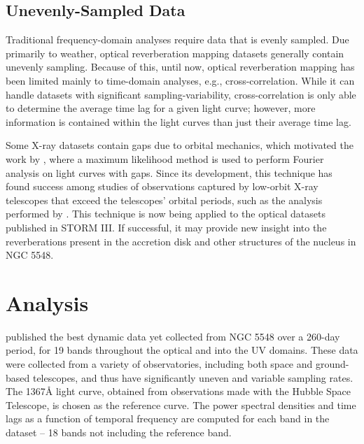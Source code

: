 \documentclass[11pt,letterpaper]{article}
\begin{document}
\begin{figure}
\begin{minipage}{.475\textwidth}
            \label{fig:th_freq}
        \end{minipage}
    \end{figure}


	\subsection{Unevenly-Sampled Data}

    Traditional frequency-domain analyses require data that is evenly sampled. Due primarily to weather, optical reverberation mapping datasets generally contain unevenly sampling. Because of this, until now, optical reverberation mapping has been limited mainly to time-domain analyses, e.g., cross-correlation. While it can handle datasets with significant sampling-variability, cross-correlation is only able to determine the average time lag for a given light curve; however, more information is contained within the light curves than just their average time lag.

    Some X-ray datasets contain gaps due to orbital mechanics, which motivated the work by \cite{2013ApJ...777...24Z}, where a maximum likelihood method is used to perform Fourier analysis on light curves with gaps. Since its development, this technique has found success among studies of observations captured by low-orbit X-ray telescopes that exceed the telescopes' orbital periods, such as the analysis performed by \cite{2016arXiv160606736K}. This technique is now being applied to the optical datasets published in STORM III. If successful, it may provide new insight into the reverberations present in the accretion disk and other structures of the nucleus in NGC 5548.

\section{Analysis}

\cite{2016ApJ...821...56F} published the best dynamic data yet collected from NGC 5548 over a 260-day period, for 19 bands throughout the optical and into the UV domains. These data were collected from a variety of observatories, including both space and ground-based telescopes, and thus have significantly uneven and variable sampling rates. The 1367\AA$ $ light curve, obtained from observations made with the Hubble Space Telescope, is chosen as the reference curve. The power spectral densities and time lags as a function of temporal frequency are computed for each band in the dataset -- 18 bands not including the reference band.
\end{document}
